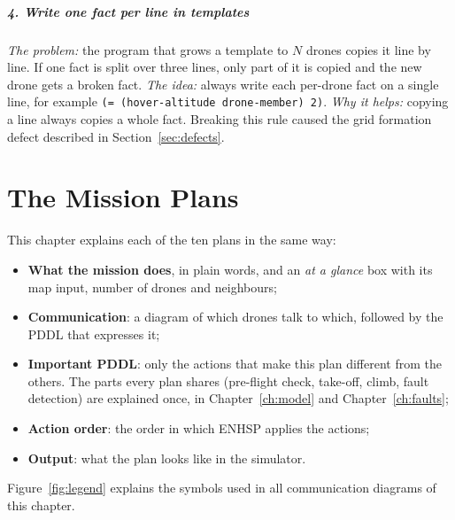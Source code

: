 \documentclass[11pt,a4paper,oneside]{report}
\newcommand{\code}[1]{\texttt{#1}}
\begin{document}
\paragraph{4. Write one fact per line in templates}
\emph{The problem:} the program that grows a template to $N$ drones copies it line by line. If
one fact is split over three lines, only part of it is copied and the new drone gets a broken
fact. \emph{The idea:} always write each per-drone fact on a single line, for example
\code{(= (hover-altitude drone-member) 2)}. \emph{Why it helps:} copying a line always copies a
whole fact. Breaking this rule caused the grid formation defect described in
Section~\ref{sec:defects}.

\chapter{The Mission Plans}\label{ch:plans}
This chapter explains each of the ten plans in the same way:
\begin{itemize}
  \item \textbf{What the mission does}, in plain words, and an \emph{at a glance} box with its
        map input, number of drones and neighbours;
  \item \textbf{Communication}: a diagram of which drones talk to which, followed by the PDDL that
        expresses it;
  \item \textbf{Important PDDL}: only the actions that make this plan different from the others.
        The parts every plan shares (pre-flight check, take-off, climb, fault detection) are
        explained once, in Chapter~\ref{ch:model} and Chapter~\ref{ch:faults};
  \item \textbf{Action order}: the order in which ENHSP applies the actions;
  \item \textbf{Output}: what the plan looks like in the simulator.
\end{itemize}
Figure~\ref{fig:legend} explains the symbols used in all communication diagrams of this chapter.
\end{document}
